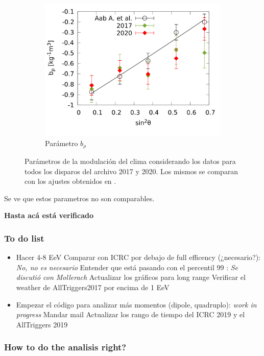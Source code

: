 \begin{figure}[H]
\begin{subfigure}[b]{\textwidth}
					\centering
					\includegraphics[width=0.5\linewidth]{params/brho_2017_2020_above_1EeV.png}
					\caption{Parámetro  $b_\rho$	 }
					\end{subfigure}%
					\caption{Parámetros de la modulación del clima considerando los datos para todos los disparos del archivo 2017 y 2020. Los mismos se comparan con los ajustes obtenidos en \cite{aab2017impact}.}
				\end{figure}

			Se ve que estos parametros no son comparables. 

{\bf Hasta acá está verificado}


\subsubsection*{To do list }
		\begin{itemize}
			\done (DONE) ¿estoy haciendo bien la cuenta? 
			\done (DONE) el log en ln o log10 para cpp? es ln==log en cpp
			\done¿Hay algo en la aproximación de rayleigh que se pasó por alto? Sigo buscando
			\done (DONE?) ¿Entiendo bien la approx? --Creo que sí, leí el paper que referencian, pero puede que un detalle se me halla escapado
	\item Hacer 4-8 EeV
	\done Comparar con ICRC por debajo de full efficency (¿necesario?): {\sl No, no es necesario}
	\done Entender que está pasando con el percentil 99 : {\sl Se discutió con Mollerach}
	 Actualizar los gráficos para long range 
	 Verificar el weather de AllTriggers2017 por encima de 1 EeV
	\item Empezar el código para analizar más momentos (dipole, quadruplo): {\sl work in progress}
	 Mandar mail
	\done Actualizar los rango de tiempo del ICRC 2019 y el AllTriggers 2019
\end{itemize}



\subsubsection*{How to do the analisis right?}

